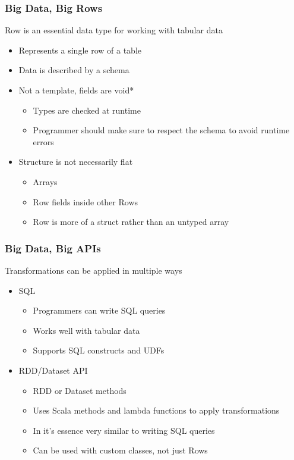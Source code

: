 \documentclass{beamer}
\begin{document}
\begin{frame}
\frametitle{Big Data, Big Rows}
Row is an essential data type for working with tabular data
\begin{itemize}
    \item Represents a single row of a table
    \item Data is described by a schema
    \item Not a template, fields are void*
        \begin{itemize}
            \item Types are checked at runtime
            \item Programmer should make sure to respect the schema to avoid runtime errors
        \end{itemize}
    \item Structure is not necessarily flat
        \begin{itemize}
            \item Arrays
            \item Row fields inside other Rows
            \item Row is more of a struct rather than an untyped array
        \end{itemize}
\end{itemize}
\end{frame}

\begin{frame}
\frametitle{Big Data, Big APIs}
Transformations can be applied in multiple ways
\begin{itemize}
    \item SQL
        \begin{itemize}
            \item Programmers can write SQL queries
            \item Works well with tabular data
            \item Supports SQL constructs and UDFs
        \end{itemize}
    \item RDD/Dataset API
        \begin{itemize}
            \item RDD or Dataset methods
            \item Uses Scala methods and lambda functions to apply transformations
            \item In it's essence very similar to writing SQL queries
            \item Can be used with custom classes, not just Rows
        \end{itemize}
\end{itemize}
\end{frame}
\end{document}
